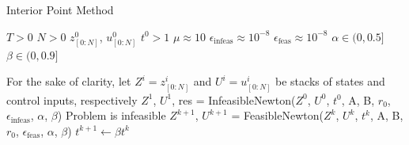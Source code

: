 \documentclass{exam}
\begin{document}
\begin{algorithm}
\caption{Interior Point Method}
\label{ipm_alg}
\begin{algorithmic}
    \Require $T > 0$ 
    \Require $N > 0$ 
    \Require $z_{[0:N]}^0$, $u_{[0:N]}^0$ 
    \Require $t^0 > 1$ 
    \Require $\mu \approx 10$ 
    \Require $\epsilon_{\textrm{infeas}} \approx 10^{-8}$ 
    \Require $\epsilon_{\textrm{feas}} \approx 10^{-8}$ 
    \Require $\alpha \in (0, 0.5]$ 
    \Require $\beta \in (0, 0.9]$ 

    \State
    \State For the sake of clarity, let $Z^i = z_{[0:N]}^i$ and $U^i = u_{[0:N]}^i$ be stacks of states and control inputs, respectively
    \State $Z^1$, $U^1$, res = InfeasibleNewton($Z^0$, $U^0$, $t^0$, A, B, $r_0$, $\epsilon_{\textrm{infeas}}$, $\alpha$, $\beta$)
        \State \Return Problem is infeasible
    \EndIf
     
        \State $Z^{k+1}$, $U^{k+1}$ = FeasibleNewton($Z^{k}$, $U^{k}$, $t^k$, A, B, $r_0$, $\epsilon_{\textrm{feas}}$, $\alpha$, $\beta$)
        \State $t^{k+1} \gets \beta t^k$
    \EndWhile
\end{algorithmic}
\end{algorithm}
\end{document}
